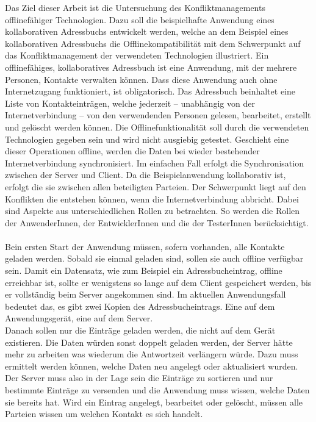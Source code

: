 Das Ziel dieser Arbeit ist die Untersuchung des Konfliktmanagements offlinefähiger Technologien.
Dazu soll die beispielhafte Anwendung eines kollaborativen Adressbuchs entwickelt werden, welche an dem Beispiel eines kollaborativen Adressbuchs die Offlinekompatibilität mit dem Schwerpunkt auf das Konfliktmanagement der verwendeten Technologien illustriert.
Ein offlinefähiges, kollaboratives Adressbuch ist eine Anwendung, mit der mehrere Personen, Kontakte verwalten können.
Dass diese Anwendung auch ohne Internetzugang funktioniert, ist obligatorisch.
Das Adressbuch beinhaltet eine Liste von Kontakteinträgen, welche jederzeit -- unabhängig von der Internetverbindung -- von den verwendenden Personen gelesen, bearbeitet, erstellt und gelöscht werden können.
Die Offlinefunktionalität soll durch die verwendeten Technologien gegeben sein und wird nicht ausgiebig getestet.
Geschieht eine dieser Operationen offline, werden die Daten bei wieder bestehender Internetverbindung synchronisiert. Im einfachen Fall erfolgt die Synchronisation zwischen der Server und Client.
Da die Beispielanwendung kollaborativ ist, erfolgt die sie zwischen allen beteiligten Parteien.
Der Schwerpunkt liegt auf den Konflikten die entstehen können, wenn die Internetverbindung abbricht.
Dabei sind Aspekte aus unterschiedlichen Rollen zu betrachten. So werden die Rollen der AnwenderInnen, der EntwicklerInnen und die der TesterInnen berücksichtigt.\\\\
%
%
Bein ersten Start der Anwendung müssen, sofern vorhanden, alle Kontakte geladen werden. Sobald sie einmal geladen sind, sollen sie auch offline verfügbar sein.
Damit ein Datensatz, wie zum Beispiel ein Adressbucheintrag, offline erreichbar ist, sollte er wenigstens so lange auf dem Client gespeichert werden, bis er vollständig beim Server angekommen sind.
Im aktuellen Anwendungsfall bedeutet das, es gibt zwei Kopien des Adressbucheintrags. Eine auf dem Anwendungsgerät, eine auf dem Server.\\
Danach sollen nur die Einträge geladen werden, die nicht auf dem Gerät existieren. Die Daten würden sonst doppelt geladen werden, der Server hätte mehr zu arbeiten was wiederum die Antwortzeit verlängern würde.
Dazu muss ermittelt werden können, welche Daten neu angelegt oder aktualisiert wurden.
Der Server muss also in der Lage sein die Einträge zu sortieren und nur bestimmte Einträge zu versenden und die Anwendung muss wissen, welche Daten sie bereits hat. Wird ein Eintrag angelegt, bearbeitet oder gelöscht, müssen alle Parteien wissen um welchen Kontakt es sich handelt.
